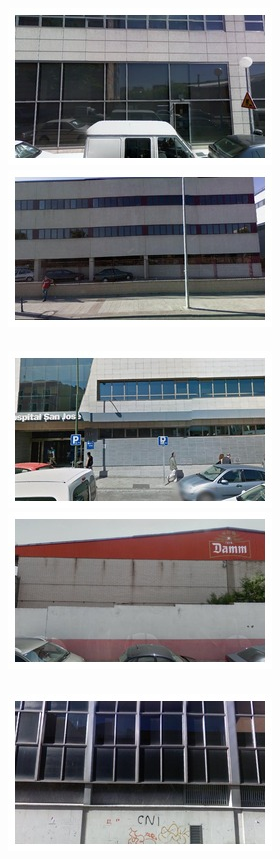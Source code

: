 \begin{figure}
  \begin{minipage}{\linewidth}
    \begin{minipage}{0.3\linewidth}
      \includegraphics[width=0.49\linewidth]{imgs/arch/mosaicsS4/mosaic0000.jpg}
      \includegraphics[width=0.49\linewidth]{imgs/arch/mosaicsS4/mosaic0001.jpg}
      \\ \vspace{-3mm} \\
      \includegraphics[width=0.49\linewidth]{imgs/arch/mosaicsS4/mosaic0002.jpg}
      \includegraphics[width=0.49\linewidth]{imgs/arch/mosaicsS4/mosaic0003.jpg}
      \\ \vspace{-3mm} \\
      \includegraphics[width=0.49\linewidth]{imgs/arch/mosaicsS4/mosaic0004.jpg}

\end{minipage}
\end{minipage}
\end{figure}
